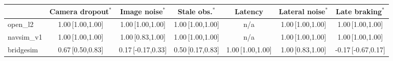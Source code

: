 \begin{tabular}{@{}lcccccc@{}}
\toprule
 & Camera dropout$^{\ast}$ & Image noise$^{\ast}$ & Stale obs.$^{\ast}$ & Latency & Lateral noise$^{\ast}$ & Late braking$^{\ast}$ \\
\midrule
open\_l2 & 1.00\,{\scriptsize[1.00,1.00]} & 1.00\,{\scriptsize[1.00,1.00]} & 1.00\,{\scriptsize[1.00,1.00]} & n/a & 1.00\,{\scriptsize[1.00,1.00]} & 1.00\,{\scriptsize[1.00,1.00]} \\
navsim\_v1 & 1.00\,{\scriptsize[1.00,1.00]} & 1.00\,{\scriptsize[0.83,1.00]} & 1.00\,{\scriptsize[1.00,1.00]} & n/a & 1.00\,{\scriptsize[1.00,1.00]} & 1.00\,{\scriptsize[1.00,1.00]} \\
bridgesim & 0.67\,{\scriptsize[0.50,0.83]} & 0.17\,{\scriptsize[-0.17,0.33]} & 0.50\,{\scriptsize[0.17,0.83]} & 1.00\,{\scriptsize[1.00,1.00]} & 1.00\,{\scriptsize[0.83,1.00]} & -0.17\,{\scriptsize[-0.67,0.17]} \\
\bottomrule
\end{tabular}
